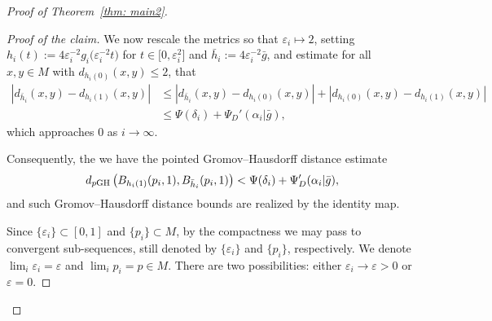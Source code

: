 \documentclass[pdftex]{sigma}
\numberwithin{equation}{section}
\begin{document}
\begin{proof}[Proof of Theorem~\ref{thm: main2}]
\begin{proof}[Proof of the claim]
We now rescale the metrics so that $\varepsilon_i\mapsto 2$, setting
$h_i(t):=4\varepsilon_i^{-2}g_i\big(\varepsilon_i^{-2} t\big)$ for $t\in
\big[0,\varepsilon_i^2\big]$ and $\bar{h}_i:=4\varepsilon_i^{-2}\bar{g}$, and
estimate for all $x,y\in M$ with $d_{h_i(0)}(x,y)\le 2$, that
\begin{align*}
 |d_{\bar{h}_i}(x,y)-d_{h_i(1)}(x,y) | & \le
 |d_{\bar{h}_i}(x,y)-d_{h_i(0)}(x,y) |
+ |d_{h_i(0)}(x,y)-d_{h_i(1)}(x,y) |\\
& \le \Psi(\delta_i)+\Psi_D'(\alpha_i|\bar{g}),
\end{align*}
which approaches $0$ as $i\to \infty$.

Consequently, the we have the pointed Gromov--Hausdorff distance estimate
\begin{align}\label{eqn: GH}
d_{p{\rm GH}}\left(B_{h_i(1)}(p_i, 1), B_{\bar{h}_i}(p_i, 1)
\right) < \Psi(\delta_i)+\Psi_D'(\alpha_i|\bar{g}),
\end{align}
and such Gromov--Hausdorff distance bounds are realized by the identity map.

Since $\{\varepsilon_i\}\subset [0,1]$ and $\{p_i\}\subset M$, by the
compactness we may pass to convergent sub-sequences, still denoted by
$\{\varepsilon_i\}$ and $\{p_i\}$, respectively. We denote
$\lim_i\varepsilon_i=\varepsilon$ and \mbox{$\lim_ip_i=p\!\in\! M$}. There are two
possibilities: either $\varepsilon_i\to\varepsilon>0$ or $\varepsilon=0$.


\end{proof}
\end{proof}
\end{document}
